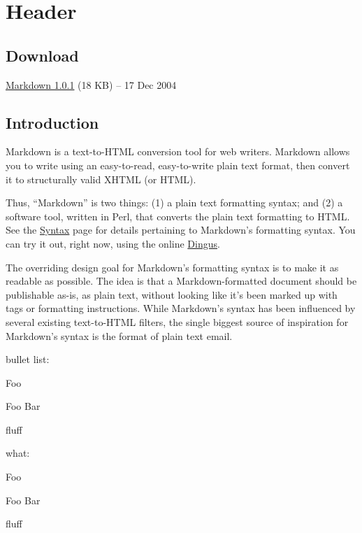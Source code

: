 \section{Header}

\subsection{Download}

\href{http://daringfireball.net/projects/downloads/Markdown_1.0.1.zip}{Markdown
1.0.1} (18 KB) -- 17 Dec 2004

\subsection{Introduction}

Markdown is a text-to-HTML conversion tool for web writers. Markdown
allows you to write using an easy-to-read, easy-to-write plain text
format, then convert it to structurally valid XHTML (or HTML).

Thus, ``Markdown'' is two things: (1) a plain text formatting syntax;
and (2) a software tool, written in Perl, that converts the plain text
formatting to HTML. See the \href{/projects/markdown/syntax}{Syntax}
page for details pertaining to Markdown's formatting syntax. You can try
it out, right now, using the online
\href{/projects/markdown/dingus}{Dingus}.

The overriding design goal for Markdown's formatting syntax is to make
it as readable as possible. The idea is that a Markdown-formatted
document should be publishable as-is, as plain text, without looking
like it's been marked up with tags or formatting instructions. While
Markdown's syntax has been influenced by several existing text-to-HTML
filters, the single biggest source of inspiration for Markdown's syntax
is the format of plain text email.

bullet list:

Foo

Foo Bar

fluff

what:

Foo

Foo Bar

fluff
